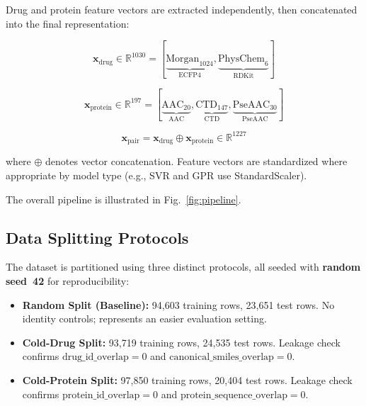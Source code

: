 \documentclass[10pt,conference]{IEEEtran}
\begin{document}
Drug and protein feature vectors are extracted independently, then concatenated into the final representation:

\begin{equation}
\mathbf{x}_{\text{drug}} \in \mathbb{R}^{1030} = [\underbrace{\text{Morgan}_{1024}}_{\text{ECFP4}}, \underbrace{\text{PhysChem}_{6}}_{\text{RDKit}}]
\label{eq:drug}
\end{equation}

\begin{equation}
\mathbf{x}_{\text{protein}} \in \mathbb{R}^{197} = [\underbrace{\text{AAC}_{20}}_{\text{AAC}}, \underbrace{\text{CTD}_{147}}_{\text{CTD}}, \underbrace{\text{PseAAC}_{30}}_{\text{PseAAC}}]
\label{eq:protein}
\end{equation}

\begin{equation}
\mathbf{x}_{\text{pair}} = \mathbf{x}_{\text{drug}} \oplus \mathbf{x}_{\text{protein}} \in \mathbb{R}^{1227}
\label{eq:pair}
\end{equation}

where $\oplus$ denotes vector concatenation. Feature vectors are standardized where appropriate by model type (e.g., SVR and GPR use StandardScaler).

The overall pipeline is illustrated in Fig.~\ref{fig:pipeline}.

\subsection{Data Splitting Protocols}
\label{subsec:splits}

The dataset is partitioned using three distinct protocols, all seeded with \textbf{random seed~42} for reproducibility:

\begin{itemize}[leftmargin=*, itemsep=0pt]
    \item \textbf{Random Split (Baseline):} 94,603 training rows, 23,651 test rows. No identity controls; represents an easier evaluation setting.
    \item \textbf{Cold-Drug Split:} 93,719 training rows, 24,535 test rows. Leakage check confirms $\text{drug\_id\_overlap} = 0$ and $\text{canonical\_smiles\_overlap} = 0$.
    \item \textbf{Cold-Protein Split:} 97,850 training rows, 20,404 test rows. Leakage check confirms $\text{protein\_id\_overlap} = 0$ and $\text{protein\_sequence\_overlap} = 0$.
\end{itemize}
\end{document}
